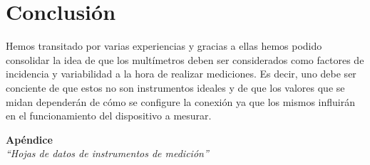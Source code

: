 \documentclass{article}
\begin{document}
\section{Conclusión}

	Hemos transitado por varias experiencias y gracias a ellas hemos podido consolidar la idea de que los multímetros deben ser considerados como factores de incidencia y variabilidad a la hora de realizar mediciones. Es decir, uno debe ser conciente de que estos no son instrumentos ideales y de que los valores que se midan dependerán de cómo se configure la conexión ya que los mismos influirán en el funcionamiento del dispositivo a mesurar. 





\newpage
\vspace*{4cm}
\begin{center}
	\textbf{\Huge{Apéndice}} \\
	\bigskip\bigskip
	\Large{\textit{``Hojas de datos de instrumentos de medición''}}
\end{center}
\end{document}
